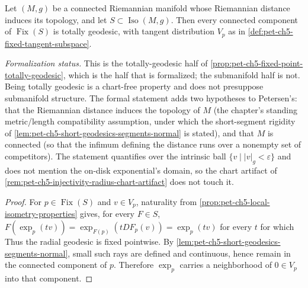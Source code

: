 \begin{proposition}
  \label{prop:pet-ch5-fixed-point-component-totally-geodesic}
  \leanok
  Let $(M,g)$ be a connected Riemannian manifold whose Riemannian distance induces
  its topology, and let $S\subset\operatorname{Iso}(M,g)$. Then every connected
  component of $\operatorname{Fix}(S)$ is totally geodesic, with tangent
  distribution $V_p$ as in \cref{def:pet-ch5-fixed-tangent-subspace}.

  \emph{Formalization status.} This is the totally-geodesic half of
  \cref{prop:pet-ch5-fixed-point-totally-geodesic}, which is the half that is
  formalized; the submanifold half is not. Being totally geodesic is a chart-free
  property and does not presuppose submanifold structure. The formal statement adds
  two hypotheses to Petersen's: that the Riemannian distance induces the topology
  of $M$ (the chapter's standing metric/length compatibility assumption, under
  which the short-segment rigidity of
  \cref{lem:pet-ch5-short-geodesics-segments-normal} is stated), and that $M$ is
  connected (so that the infimum defining the distance runs over a nonempty set of
  competitors). The statement quantifies over the intrinsic ball
  $\{v\mid|v|_g<\varepsilon\}$ and does not mention the on-disk exponential's
  domain, so the chart artifact of
  \cref{rem:pet-ch5-injectivity-radius-chart-artifact} does not touch it.
\end{proposition}
\begin{proof}
  \leanok
  \sketch
  For $p\in\operatorname{Fix}(S)$ and $v\in V_p$, naturality from
  \cref{prop:pet-ch5-local-isometry-properties} gives, for every $F\in S$,
  $F(\exp_p(tv))=\exp_{F(p)}(tDF_p(v))=\exp_p(tv)$ for every $t$ for which
  Thus the radial geodesic is fixed pointwise.  By
  \cref{lem:pet-ch5-short-geodesics-segments-normal}, small such rays are defined
  and continuous, hence remain in the connected component of $p$.  Therefore
  $\exp_p$ carries a neighborhood of $0\in V_p$ into that component.
\end{proof}

